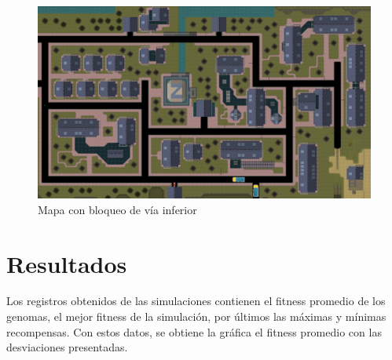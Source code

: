 \documentclass[lettersize, journal]{IEEEtran}
\begin{document}
\begin{figure}
    \centering    \includegraphics[width=0.8\linewidth]{Simulacion/gta.png}
    \caption{Mapa con bloqueo de vía inferior}
    \label{fig:mapa2}
\end{figure}

\section{Resultados}
Los registros obtenidos de las simulaciones contienen el fitness promedio de los genomas, el mejor fitness de la simulación, por últimos las máximas y mínimas recompensas. Con estos datos, se obtiene la gráfica el fitness promedio con las desviaciones presentadas.

\end{document}
